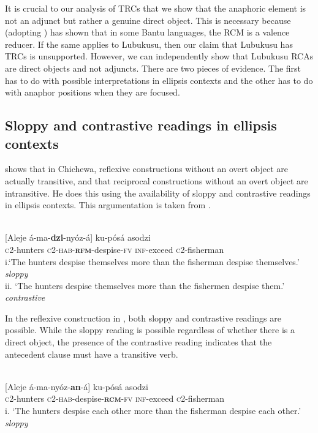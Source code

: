 \documentclass[output=paper]{langsci/langscibook}
\begin{document}
It is crucial to our analysis of TRCs that we show that the anaphoric element is not an adjunct but rather a genuine direct object. This is necessary because \citet{Mchombo1994} (adopting \citealt{ReinhartReuland1993}) has shown that in some Bantu languages, the RCM is a valence reducer. If the same applies to Lubukusu, then our claim that Lubukusu has TRCs is unsupported. However, we can independently show that Lubukusu RCAs are direct objects and not adjuncts. There are two pieces of evidence. The first has to do with possible interpretations in ellipsis contexts and the other has to do with anaphor positions when they are focused.

\subsection{Sloppy and contrastive readings in ellipsis contexts}

\citet[106]{Mchombo2004} shows that in Chichewa, reflexive constructions without an overt object are actually transitive, and that reciprocal constructions without an overt object are intransitive. He does this using the availability of sloppy and contrastive readings in ellipsis contexts. This argumentation is taken from \citet{SellsEtAl1987}.



\ea\label{ex:}
\\
{}[Aleje    á-ma-\textbf{{dzi}}{-nyóz-á}] ku-pósá   asodzi \\
  \textsc{c}2-hunters   \textsc{c2-hab-}\textbf{\textsc{rfm}}-despise-\textsc{fv}   \textsc{inf}-exceed   \textsc{c}2-fisherman\\
\glt i.‘The hunters despise themselves more than the fisherman despise themselves.’ \textit{sloppy} \\
\glt ii. ‘The hunters despise themselves more than the fishermen despise them.’    \textit{contrastive}
\z


In the reflexive construction in , both sloppy and contrastive readings are possible. While the sloppy reading is possible regardless of whether there is a direct object, the presence of the contrastive reading indicates that the antecedent clause must have a transitive verb. 


\ea\label{ex:}
  \\
\gll {}[Aleje     á-ma-nyóz-\textbf{an}-á]    ku-pósá   asodzi \\
\textsc{c}2-hunters   \textsc{c2-hab}-despise-\textbf{\textsc{rcm}}\textsc{-fv}     \textsc{inf}-exceed   \textsc{c}2-fisherman \\
\glt
i. ‘The hunters despise each other more than the fisherman despise each other.'  \textit{sloppy}  
\z
\end{document}
